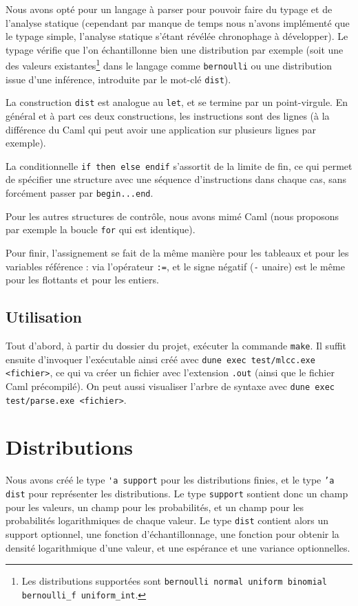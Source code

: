 \documentclass[svgnames]{article}
\begin{document}
Nous avons opté pour un langage à parser pour pouvoir faire du typage et de l'analyse statique (cependant par manque de temps nous n'avons implémenté que le typage simple, l'analyse statique s'étant révélée chronophage à développer).
Le typage vérifie que l'on échantillonne bien une distribution par exemple (soit une des valeurs existantes\footnote{Les distributions supportées sont \texttt{bernoulli normal uniform binomial bernoulli\_f uniform\_int}.} dans le langage comme \verb|bernoulli| ou une distribution issue d'une inférence, introduite par le mot-clé \lstinline{dist}).

La construction \lstinline{dist} est analogue au \lstinline{let}, et se termine par un point-virgule. En général et à part ces deux constructions, les instructions sont des lignes (à la différence du Caml qui peut avoir une application sur plusieurs lignes par exemple). 

La conditionnelle \lstinline{if then else endif} s'assortit de la limite de fin, ce qui permet de spécifier une structure avec une séquence d'instructions dans chaque cas, sans forcément passer par \lstinline{begin...end}.

Pour les autres structures de contrôle, nous avons mimé Caml (nous proposons par exemple la boucle \lstinline{for} qui est identique).

Pour finir, l'assignement se fait de la même manière pour les tableaux et pour les variables référence : via l'opérateur \verb|:=|, et le signe négatif (\verb|-| unaire) est le même pour les flottants et pour les entiers.

\subsection{Utilisation}

Tout d'abord, à partir du dossier du projet, exécuter la commande \verb|make|. Il suffit ensuite d'invoquer l'exécutable ainsi créé avec \verb|dune exec test/mlcc.exe <fichier>|, ce qui va créer un fichier avec l'extension \verb|.out| (ainsi que le fichier Caml précompilé). On peut aussi visualiser l'arbre de syntaxe avec \verb|dune exec test/parse.exe <fichier>|.

\section{Distributions}

Nous avons créé le type \verb|'a support| pour les distributions finies, et le type \texttt{'a dist} pour représenter les distributions. Le type \texttt{support} sontient donc un champ pour les valeurs, un champ pour les probabilités, et un champ pour les probabilités logarithmiques de chaque valeur. Le type \texttt{dist} contient alors un support optionnel, une fonction d'échantillonnage, une fonction pour obtenir la densité logarithmique d'une valeur, et une espérance et une variance optionnelles.
\end{document}
